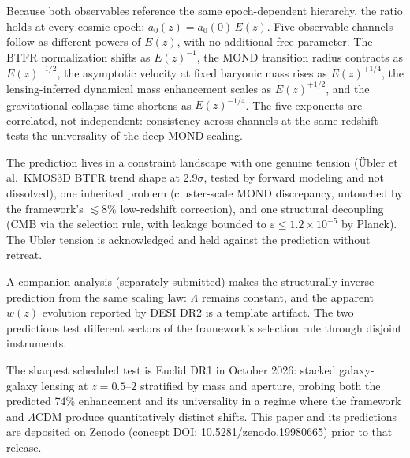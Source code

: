 \documentclass[
    aps,
    prd,
    reprint,
    superscriptaddress,
    nofootinbib,
    floatfix
]{revtex4-2}
\begin{document}
Because both observables reference the same epoch-dependent
hierarchy, the ratio holds at every cosmic epoch:
$a_0(z) = a_0(0)\,E(z)$. Five observable channels follow as different
powers of $E(z)$, with no additional free parameter. The BTFR
normalization shifts as $E(z)^{-1}$, the MOND transition radius
contracts as $E(z)^{-1/2}$, the asymptotic velocity at fixed baryonic
mass rises as $E(z)^{+1/4}$, the lensing-inferred dynamical mass
enhancement scales as $E(z)^{+1/2}$, and the gravitational collapse
time shortens as $E(z)^{-1/4}$. The five exponents are correlated,
not independent: consistency across channels at the same redshift
tests the universality of the deep-MOND scaling.

The prediction lives in a constraint landscape with one genuine
tension (\"Ubler et al.\ KMOS3D BTFR trend shape at 2.9$\sigma$,
tested by forward modeling and not dissolved), one inherited problem
(cluster-scale MOND discrepancy, untouched by the framework's
$\lesssim 8\%$ low-redshift correction), and one structural
decoupling (CMB via the selection rule, with leakage bounded to
$\varepsilon \leq 1.2 \times 10^{-5}$ by Planck). The \"Ubler
tension is acknowledged and held against the prediction without
retreat.

A companion analysis (separately submitted) makes the structurally
inverse prediction from the same scaling law: $\Lambda$ remains
constant, and the apparent $w(z)$ evolution reported by DESI DR2 is a
template artifact. The two predictions test different sectors of the
framework's selection rule through disjoint instruments.

The sharpest scheduled test is Euclid DR1 in October 2026: stacked
galaxy-galaxy lensing at $z = 0.5\text{--}2$ stratified by mass and
aperture, probing both the predicted 74\% enhancement and its
universality in a regime where the framework and $\Lambda$CDM
produce quantitatively distinct shifts. This paper and its
predictions are deposited on Zenodo (concept DOI:
\href{https://doi.org/10.5281/zenodo.19980665}{10.5281/zenodo.19980665})
prior to that release.
\end{document}
